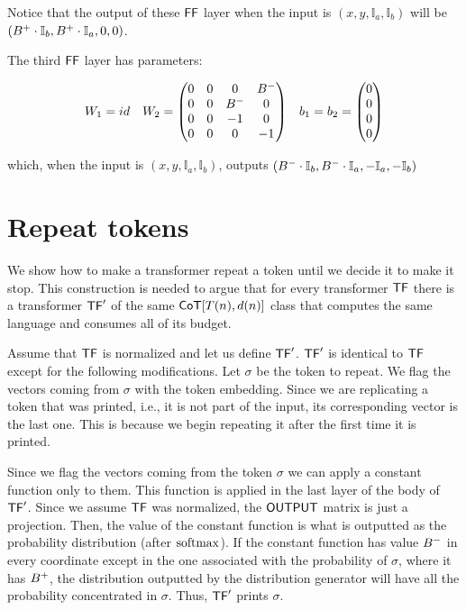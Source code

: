 \noindent Notice that the output of these $\mathsf{FF}$ layer when the input is $(x, y, \mathbb{I}_a, \mathbb{I}_b)$ will be $(B^{+} \cdot \mathbb{I}_b, B^{+} \cdot \mathbb{I}_a, 0, 0)$.

The third $\mathsf{FF}$ layer has parameters:

\begin{align*}
    & W_1 = id
    & W_2  = \left(\begin{matrix}
        0  & 0  & 0        & B^{-}   \\
        0  & 0  & B^{-}  & 0         \\
        0  & 0  & -1       & 0         \\
        0  & 0  & 0        & -1        \\
    \end{matrix}\right) &
    & b_1 = b_2 = \left(\begin{matrix}
        0 \\
        0 \\
        0 \\
        0
    \end{matrix}\right) 
\end{align*}

\noindent which, when the input is $(x, y, \mathbb{I}_a, \mathbb{I}_b)$, outputs $(B^{-} \cdot \mathbb{I}_b, B^{-} \cdot \mathbb{I}_a, -\mathbb{I}_a, -\mathbb{I}_b)$





\section{Repeat tokens}\label{appendix:repeat-token}

We show how to make a transformer repeat a token until we decide it to make it stop.
This construction is needed to argue that for every transformer $\mathsf{TF}$ there is a transformer $\mathsf{TF}'$ of the same $\mathsf{CoT}[T(n), d(n)]$ class that computes the same language and consumes all of its budget.

Assume that $\mathsf{TF}$ is normalized and let us define $\mathsf{TF}'$.
$\mathsf{TF}'$ is identical to $\mathsf{TF}$ except for the following modifications.
Let $\sigma$ be the token to repeat.
We flag the vectors coming from $\sigma$ with the token embedding.
Since we are replicating a token that was printed, i.e., it is not part of the input, its corresponding vector is the last one.
This is because we begin repeating it after the first time it is printed.


Since we flag the vectors coming from the token $\sigma$ we can apply a constant function only to them.
This function is applied in the last layer of the body of $\mathsf{TF}'$.
Since we assume $\mathsf{TF}$ was normalized, the $\mathsf{OUTPUT}$ matrix is just a projection.
Then, the value of the constant function is what is outputted as the probability distribution (after $\mathrm{softmax}$).
If the constant function has value $B^{-}$ in every coordinate except in the one associated with the probability of $\sigma$, where it has $B^{+}$, the distribution outputted by the distribution generator will have all the probability concentrated in $\sigma$.
Thus, $\mathsf{TF}'$ prints $\sigma$.

